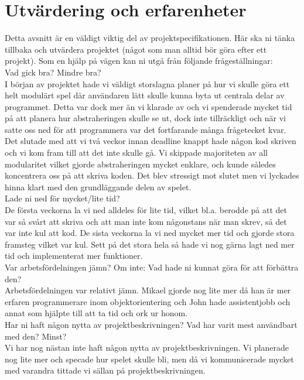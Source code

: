 \section{Utvärdering och erfarenheter}
{\color{red}Detta avsnitt är en väldigt viktig del av projektspecifikationen. Här ska ni tänka tillbaka och utvärdera projektet (något som man alltid bör göra efter ett projekt). Som en hjälp på vägen kan ni utgå från följande frågeställningar:\\
Vad gick bra? Mindre bra?\\}
I början av projektet hade vi väldigt storslagna planer på hur vi skulle göra ett helt modulärt spel där användaren lätt skulle kunna byta ut centrala delar av programmet. Detta var dock mer än vi klarade av och vi spenderade mycket tid på att planera hur abstraheringen skulle se ut, dock inte tillräckligt och när vi satte oss ned för att programmera var det fortfarande många frågetecket kvar. Det slutade med att vi två veckor innan deadline knappt hade någon kod skriven och vi kom fram till att det inte skulle gå. Vi skippade majoriteten av all modularitet vilket gjorde abstraheringen mycket enklare, och kunde således koncentrera oss på att skriva koden. Det blev stressigt mot slutet men vi lyckades hinna klart med den grundläggande delen av spelet.\\
Lade ni ned för mycket/lite tid?\\
De första veckorna la vi ned alldeles för lite tid, vilket bl.a. berodde på att det var så svårt att skriva och att man inte kom någonstans när man skrev, så det var inte kul att kod. De sista veckorna la vi ned mycket mer tid och gjorde stora framsteg vilket var kul. Sett på det stora hela så hade vi nog gärna lagt ned mer tid och implementerat mer funktioner.\\
Var arbetsfördelningen jämn? Om inte: Vad hade ni kunnat göra för att förbättra den?\\
Arbetsfördelningen var relativt jämn. Mikael gjorde nog lite mer då han är mer erfaren programmerare inom objektorientering och John hade assistentjobb och annat som hjälpte till att ta tid och ork ur honom.\\
Har ni haft någon nytta av projektbeskrivningen? Vad har varit mest användbart med den? Minst?\\
Vi har nog nästan inte haft någon nytta av projektbeskrivningen. Vi planerade nog lite mer och specade hur spelet skulle bli, men då vi kommunicerade mycket med varandra tittade vi sällan på projektbeskrivningen. \\
